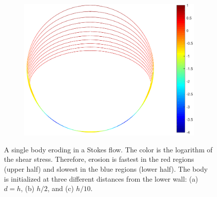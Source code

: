 \documentclass[preprint, 10pt]{elsarticle}
\begin{document}
\begin{figure}[htbp]
\begin{center}
\begin{subfigure}[b]{0.3\textwidth}
\caption{}
\end{subfigure}
\begin{subfigure}[b]{0.38\textwidth}
\includegraphics[width =\textwidth]{./figs/1b_0d4r0d1h_shear}
\caption{}
\end{subfigure}
\caption{\label{fig:NearWall} A single body eroding in a Stokes flow.
The color is the logarithm of the shear stress. Therefore, erosion is
fastest in the red regions (upper half) and slowest in the blue regions
(lower half).  The body is initialized at three different distances from
the lower wall: (a) $d=h$, (b) $h/2$, and (c) $h/10$.}
\end{center}
\end{figure}
\end{document}
